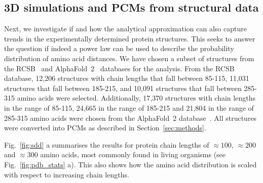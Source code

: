 \documentclass[
reprint,
twocolumn,
amsmath,amssymb,superscriptaddress,aps,
pre]{revtex4-1}
\begin{document}
\subsection{3D simulations and PCMs from structural data }
Next, we investigate if and how the analytical approximation can also capture trends in the experimentally determined protein structures.
This seeks to answer the question if indeed a power law can be used to describe the probability distribution of amino acid distances. We have chosen a subset of structures from the RCSB~\cite{PDB} and AlphaFold~2~\cite{jumper2021highly} databases for the analysis. From the RCSB database, 12,206 structures with chain lengths that fall between 85-115, 11,031 structures that fall between 185-215, and 10,091 structures that fall between 285-315 amino acids were selected. Additionally, 17,370 structures with chain lengths in the range of 85-115, 24,665 in the range of 185-215 and 21,804 in the range of 285-315 amino acids were chosen from the AlphaFold~2 database~\cite{jumper2021highly}. All structures were converted into PCMs as described in Section~\ref{sec:methods}. 

Fig.~\ref{fig:sdd} a summarises the results for protein chain lengths of $\approx100$, $\approx200$ and $\approx300$ amino acids, most commonly found in living organisms (see Fig.~\ref{fig:pdb_stats} a). This also shows how the amino acid distribution is scaled with respect to increasing chain lengths.
\end{document}
